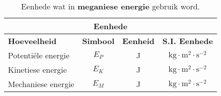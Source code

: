 \begin{table}[H]
\begin{center}
\begin{tabular}{|l|c|c|c|}\hline \hline 
\multicolumn{4}{|c|}{\textbf{Eenhede}}\\ \hline \hline
\textbf{Hoeveelheid} & \textbf{Simbool} & \textbf{Eenheid} & \textbf{S.I. Eenhede}\\ \hline
Potenti\"ele energie & $E_{P}$ & J & $\text{kg} \cdot \text{m}^{2} \cdot \text{s}^{-2}$ \\ \hline
Kinetiese energie & $E_{K}$ & J & $\text{kg} \cdot \text{m}^{2} \cdot \text{s}^{-2}$ \\ \hline
Mechaniese energie & $E_{M}$ & J & $\text{kg} \cdot \text{m}^{2} \cdot \text{s}^{-2}$ \\ \hline
\end{tabular}
\end{center}
\caption{Eenhede wat in \textbf{meganiese energie} gebruik word.}
\label{table:electricity::units}
\end{table}
    \label{m38786*cid9}
